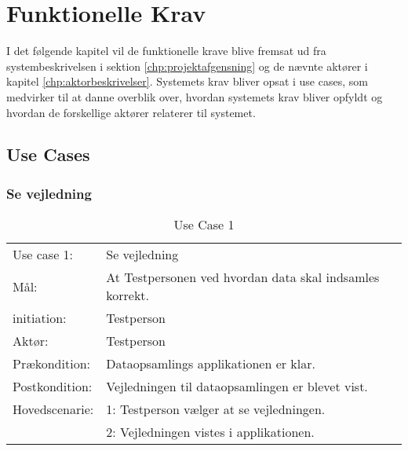 \chapter{Funktionelle Krav}
\label{chp:funktionellen}
I det følgende kapitel vil de funktionelle krave blive fremsat ud fra systembeskrivelsen i sektion \ref{chp:projektafgensning} og de nævnte aktører i kapitel \ref{chp:aktorbeskrivelser}. Systemets krav bliver opsat i use cases, som medvirker til at danne overblik over, hvordan systemets krav bliver opfyldt og hvordan de forskellige aktører relaterer til systemet.
\section{Use Cases}

\newpage
\subsection{Se vejledning}
\bgroup
\def\arraystretch{1.4}
\begin{center}
	\begin{table}[htbp]
		\begin{tabular}{lp{274pt}}
			\rowcolor{grey} Use case 1:	& Se vejledning \\
			Mål:	& At Testpersonen ved hvordan data skal indsamles korrekt. \\
			initiation:	& Testperson\\
			Aktør: & Testperson\\
			Prækondition: & Dataopsamlings applikationen er klar.\\
			Postkondition: & Vejledningen til dataopsamlingen er blevet vist.\\
			Hovedscenarie: & 1: Testperson vælger at se vejledningen.\\
			& 2: Vejledningen vistes i applikationen.\\
		\end{tabular}
		\caption{Use Case 1}
	\end{table}
\end{center}

